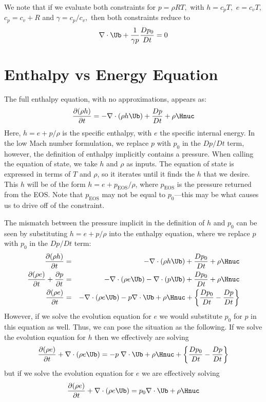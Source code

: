 We note that if we evaluate both constraints for $p = \rho R T,$ with
$h = c_p T,$ $e = c_v T,$ $c_p = c_v + R$ and $\gamma = c_p / c_v,$
then both constraints reduce to
\begin{equation}
\nabla \cdot \Ub + \frac{1}{\gamma p} \frac{D p_0}{D t} = 0
\end{equation}


\section{Enthalpy vs Energy Equation}

The full enthalpy equation, with no approximations, appears as:
\begin{equation}
\frac{\partial(\rho h)}{\partial t} = -\nabla\cdot(\rho h\Ub) + 
  \frac{Dp}{Dt} + \rho\Hnuc \label{eq:enthalpy}
\end{equation}
Here, $h = e + p/\rho$ is the specific enthalpy, with $e$ the specific
internal energy.  In the low Mach number formulation, we replace $p$
with $p_0$ in the $Dp/Dt$ term, however, the definition of enthalpy
implicitly contains a pressure.  When calling the equation of state,
we take $h$ and $\rho$ as inputs.  The equation of state is expressed
in terms of $T$ and $\rho$, so it iterates until it finds the $h$ that
we desire.  This $h$ will be of the form $h = e + p_\mathrm{EOS}/\rho$,
where $p_\mathrm{EOS}$ is the pressure returned from the EOS.  Note that
$p_\mathrm{EOS}$ may not be equal to $p_0$---this may be what
causes us to drive off of the constraint. 

The mismatch between the pressure implicit in the definition of $h$
and $p_0$ can be seen by substituting $h = e + p/\rho$ into the
enthalpy equation, where we replace $p$ with $p_0$ in the $Dp/Dt$ term:
\begin{eqnarray}
\frac{\partial(\rho h)}{\partial t} &=& -\nabla\cdot(\rho h\Ub) + 
  \frac{Dp_0}{Dt} + \rho\Hnuc \nonumber \\
%
\frac{\partial(\rho e)}{\partial t} + \frac{\partial p}{\partial t} &=&
 -\nabla\cdot(\rho e\Ub) -\nabla\cdot(p\Ub) + \frac{Dp_0}{Dt} + \rho\Hnuc \nonumber \\
%
\frac{\partial(\rho e)}{\partial t} &=&
 -\nabla\cdot(\rho e\Ub) - p\nabla\cdot\Ub + \rho\Hnuc + 
  \left \{ \frac{Dp_0}{Dt} - \frac{Dp}{Dt} \right \} \nonumber 
\end{eqnarray}
However, if we solve the evolution equation for $e$ we would
substitute $p_0$ for $p$ in this equation as well.  Thus, we can pose
the situation as the following.  If we solve the evolution equation
for $h$ then we effectively are solving
\begin{equation}
\frac{\partial(\rho e)}{\partial t} +
  \nabla\cdot(\rho e\Ub) = -p \; \nabla\cdot\Ub + \rho\Hnuc + 
  \left \{ \frac{Dp_0}{Dt} - \frac{Dp}{Dt} \right \} \nonumber 
\end{equation}
but if we solve the evolution equation for $e$ we are effectively solving
\begin{equation}
\frac{\partial(\rho e)}{\partial t} +
  \nabla\cdot(\rho e\Ub) = p_0 \nabla\cdot\Ub + \rho\Hnuc \nonumber 
\end{equation}

